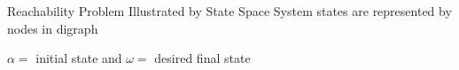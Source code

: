 \documentclass[8pt]{beamer}
\begin{document}
\begin{frame}{Reachability Problem Illustrated by State Space}
System states are represented by nodes in digraph

$\alpha=$ initial state and $\omega=$ desired final state

    \vspace{0.2cm}
\begin{columns}
\begin{column}{0.5\textwidth}
\centering
    
\end{column}
\begin{column}{0.5\textwidth}
\end{column}
\end{columns}
    

    
\end{frame}
\end{document}
